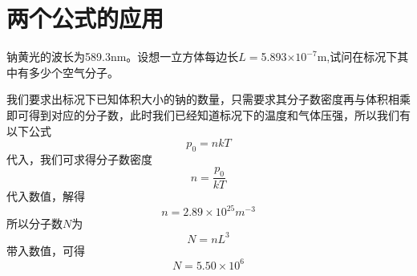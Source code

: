 \documentclass[lang=cn,10pt]{elegantbook}
\begin{document}
	\section{两个公式的应用}
	\begin{example}
		钠黄光的波长为589.3nm。设想一立方体每边长$L=$5.893$\times 10 ^{-7}$m,试问在标况下其中有多少个空气分子。
	\end{example}
	\begin{solution}
		我们要求出标况下已知体积大小的钠的数量，只需要求其分子数密度再与体积相乘即可得到对应的分子数，此时我们已经知道标况下的温度和气体压强，所以我们有以下公式
		\begin{equation*}
			p_{0}=nkT
		\end{equation*}
		代入，我们可求得分子数密度
		\begin{equation*}
			n=\frac{p_{0}}{kT}
		\end{equation*}
		代入数值，解得
		\begin{equation*}
			n=2.89\times10^{25}m^{-3}
		\end{equation*}
		所以分子数$N$为
		\begin{equation*}
			N=nL^{3}
		\end{equation*}
			带入数值，可得
		\begin{equation*}
			N=5.50\times10^{6}
		\end{equation*}
	\end{solution}
	
\end{document}
